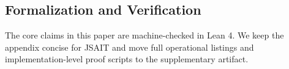 \subsection{Formalization and Verification}\label{formalization-and-verification}

The core claims in this paper are machine-checked in Lean 4. We keep the appendix concise for JSAIT and move full operational listings and implementation-level proof scripts to the supplementary artifact.

\newcommand{\LeanLinesAbstractClassSystemAggregate}{\number\numexpr\LeanLinesAbstractClassSystemBZeroFourFiveefNineFour+\LeanLinesAbstractClassSystemAxisClosure+\LeanLinesAbstractClassSystemBridge+\LeanLinesAbstractClassSystemCore+\LeanLinesAbstractClassSystemExtended+\LeanLinesAbstractClassSystemGraphBridges+\LeanLinesAbstractClassSystemTyping+\LeanLinesAbstractClassSystemEightOneSixTwoFourOnebFour\relax}
\newcommand{\LeanTheoremsAbstractClassSystemAggregate}{\number\numexpr\LeanTheoremsAbstractClassSystemBZeroFourFiveefNineFour+\LeanTheoremsAbstractClassSystemAxisClosure+\LeanTheoremsAbstractClassSystemBridge+\LeanTheoremsAbstractClassSystemCore+\LeanTheoremsAbstractClassSystemExtended+\LeanTheoremsAbstractClassSystemGraphBridges+\LeanTheoremsAbstractClassSystemTyping+\LeanTheoremsAbstractClassSystemEightOneSixTwoFourOnebFour\relax}
\newcommand{\LeanLinesCoreShown}{\number\numexpr\LeanLinesAbstractClassSystemAggregate+\LeanLinesAxisFramework+\LeanLinesNominalResolution+\LeanLinesDisciplineMigration+\LeanLinesContextFormalization+\LeanLinesPythonInstantiation+\LeanLinesTypescriptInstantiation+\LeanLinesJavaInstantiation+\LeanLinesRustInstantiation+\LeanLinesLwdConverse\relax}
\newcommand{\LeanTheoremsCoreShown}{\number\numexpr\LeanTheoremsAbstractClassSystemAggregate+\LeanTheoremsAxisFramework+\LeanTheoremsNominalResolution+\LeanTheoremsDisciplineMigration+\LeanTheoremsContextFormalization+\LeanTheoremsPythonInstantiation+\LeanTheoremsTypescriptInstantiation+\LeanTheoremsJavaInstantiation+\LeanTheoremsRustInstantiation+\LeanTheoremsLwdConverse\relax}
\newcommand{\LeanLinesSupportFiles}{\number\numexpr\LeanTotalLines-\LeanLinesCoreShown\relax}
\newcommand{\LeanTheoremsSupportFiles}{\number\numexpr\LeanTotalTheorems-\LeanTheoremsCoreShown\relax}

